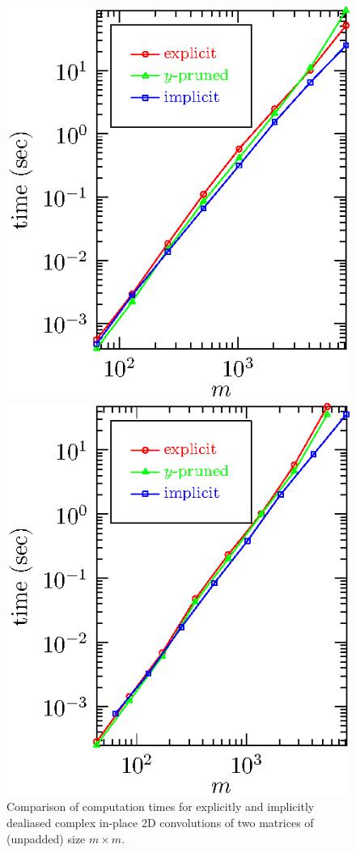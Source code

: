 \documentclass[final]{siamltex}
\begin{document}
\begin{figure}[htbp]
\begin{minipage}{0.5\linewidth}
\begin{center}
\includegraphics{timing2c}
\caption{Comparison of computation times for explicitly and implicitly
dealiased complex in-place 2D convolutions of two matrices of
(unpadded) size $m\times m$.}
\label{timing2c}
\end{center}
\end{minipage}
%
\begin{minipage}{0.5\linewidth}
\begin{center}
\includegraphics{timing2r}

\end{center}
\end{minipage}
\end{figure}
\end{document}
